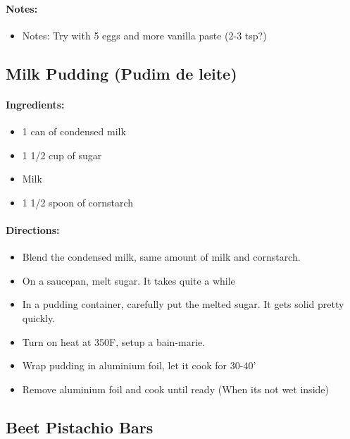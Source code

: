 \documentclass{article}
\begin{document}
\paragraph{Notes:}
\begin{itemize}
	\item Notes: Try with 5 eggs and more vanilla paste (2-3 tsp?)
\end{itemize}

\subsection{Milk Pudding (Pudim de leite)}

\paragraph{Ingredients:}

\begin{itemize}
	\item 1 can of condensed milk
	\item 1 1/2 cup of sugar
	\item Milk
	\item 1 1/2 spoon of cornstarch
\end{itemize}

\paragraph{Directions:}
\begin{itemize}
	\item Blend the condensed milk, same amount of milk and cornstarch.
	\item On a saucepan, melt sugar. It takes quite a while
	\item In a pudding container, carefully put the melted sugar. It gets solid pretty quickly.
	\item Turn on heat at 350F, setup a bain-marie.
	\item Wrap pudding in aluminium foil, let it cook for 30-40'
	\item Remove aluminium foil and cook until ready (When its not wet inside)
\end{itemize}

\subsection{Beet Pistachio Bars}
\end{document}
